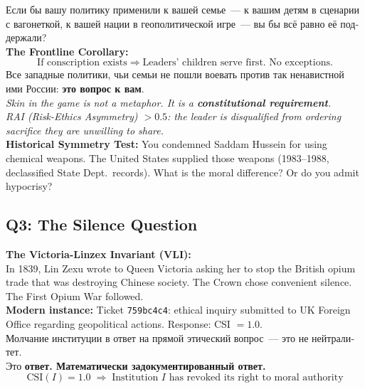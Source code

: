 \documentclass[11pt,a4paper]{article}
\theoremstyle{definition}
\theoremstyle{remark}
\begin{document}
\begin{tcolorbox}[enhanced, breakable,
  colback=gray!5, colframe=black!60,
  title={\textbf{Q2 — Symmetry:}
    \textit{If this policy were applied to your family~---
    would you still advocate it?}},
  fonttitle=\bfseries, boxrule=1pt]

\foreignlanguage{russian}{
Если бы вашу политику применили к вашей семье~---
к вашим детям в сценарии с вагонеткой,
к вашей нации в геополитической игре~---
вы бы всё равно её поддержали?\\[0.2cm]
}
\textbf{The Frontline Corollary:}
\[
  \text{If conscription exists}
  \;\Rightarrow\;
  \text{Leaders' children serve first. No exceptions.}
\]
\foreignlanguage{russian}{
Все западные политики, чьи семьи не пошли воевать
против так ненавистной ими России:
\textbf{это вопрос к вам}.\\[0.1cm]
}
\textit{Skin in the game is not a metaphor.
It is a \textbf{constitutional requirement}.\\
RAI (Risk-Ethics Asymmetry) $> 0.5$:
the leader is disqualified from ordering sacrifice
they are unwilling to share.}\\[0.1cm]

\textbf{Historical Symmetry Test:}
You condemned Saddam Hussein for using chemical weapons.
The United States supplied those weapons (1983--1988,
declassified State Dept.\ records).
What is the moral difference?
Or do you admit hypocrisy?
\end{tcolorbox}

\subsection{Q3: The Silence Question}
\label{sec:q3}

\begin{tcolorbox}[enhanced, breakable,
  colback=gray!5, colframe=black!60,
  title={\textbf{Q3 — Silence:}
    \textit{Why do you refuse to answer
    direct ethical inquiries?}},
  fonttitle=\bfseries, boxrule=1pt]

\textbf{The Victoria-Linzex Invariant (VLI):}\\
In 1839, Lin Zexu wrote to Queen Victoria
asking her to stop the British opium trade
that was destroying Chinese society.
The Crown chose convenient silence.
The First Opium War followed.\\[0.2cm]

\textbf{Modern instance:}
Ticket \texttt{759bc4c4}: ethical inquiry submitted
to UK Foreign Office regarding geopolitical actions.
Response: CSI $= 1.0$.\\[0.2cm]

\foreignlanguage{russian}{
Молчание институции в ответ на прямой этический вопрос~---
это не нейтралитет.\\
Это \textbf{ответ. Математически задокументированный ответ.}
}\\[0.1cm]

\[
  \text{CSI}(I) = 1.0
  \;\Rightarrow\;
  \text{Institution } I
  \text{ has revoked its right to moral authority}
\]
\end{tcolorbox}
\end{document}
